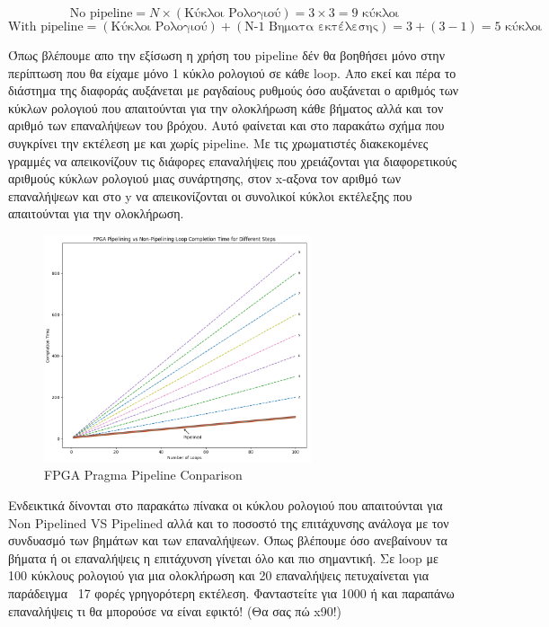 \[
\text{Νο pipeline} = N \times (\text{Κύκλοι Ρολογιού}) = 3 \times 3 = 9 \text{ κύκλοι}
\]
\[
\text{With pipeline} = (\text{Κύκλοι Ρολογιού}) + (\text{Ν-1 Βηματα εκτέλεσης}) = 3 + (3 - 1) = 5 \text{ κύκλοι}
\]
    
Όπως βλέπουμε απο την εξίσωση η χρήση του pipeline δέν θα βοηθήσει μόνο στην περίπτωση που θα είχαμε μόνο 1 κύκλο ρολογιού σε κάθε loop.
Απο εκεί και πέρα το διάστημα της διαφοράς αυξάνεται με ραγδαίους ρυθμούς όσο αυξάνεται ο αριθμός των κύκλων ρολογιού που απαιτούνται για την ολοκλήρωση κάθε βήματος
αλλά και τον αριθμό των επαναλήψεων του βρόχου. Αυτό φαίνεται και στο παρακάτω σχήμα που συγκρίνει την εκτέλεση με και χωρίς pipeline. Με τις χρωματιστές διακεκομένες γραμμές
να απεικονίζουν τις διάφορες επαναλήψεις που χρειάζονται για διαφορετικούς αριθμούς κύκλων ρολογιού μιας συνάρτησης, στον x-αξονα τον αριθμό των επαναλήψεων και στο y να απεικονίζονται
οι συνολικοί κύκλοι εκτέλεξης που απαιτούνται για την ολοκλήρωση.

\begin{figure}[h!]
  \centering
  \includegraphics[width=0.7\textwidth]{figures/chapter3/fpga_pipelining_comparison.png}
  \caption{FPGA Pragma Pipeline Conparison}
    \label{fig:fpga_pipelining_comparison}
\end{figure}

Ενδεικτικά δίνονται στο παρακάτω πίνακα οι κύκλου ρολογιού που απαιτούνται για Non Pipelined VS Pipelined αλλά και
το ποσοστό της επιτάχυνσης ανάλογα με τον συνδυασμό των βημάτων και των επαναλήψεων. Όπως βλέπουμε όσο ανεβαίνουν τα βήματα ή οι επαναλήψεις
η επιτάχυνση γίνεται όλο και πιο σημαντική. Σε loop με 100 κύκλους ρολογιού για μια ολοκλήρωση και 20 επαναλήψεις πετυχαίνεται για παράδειγμα
~17 φορές γρηγορότερη εκτέλεση. Φανταστείτε για 1000 ή και παραπάνω επαναλήψεις τι θα μπορούσε να είναι εφικτό! (Θα σας πώ x90!)

